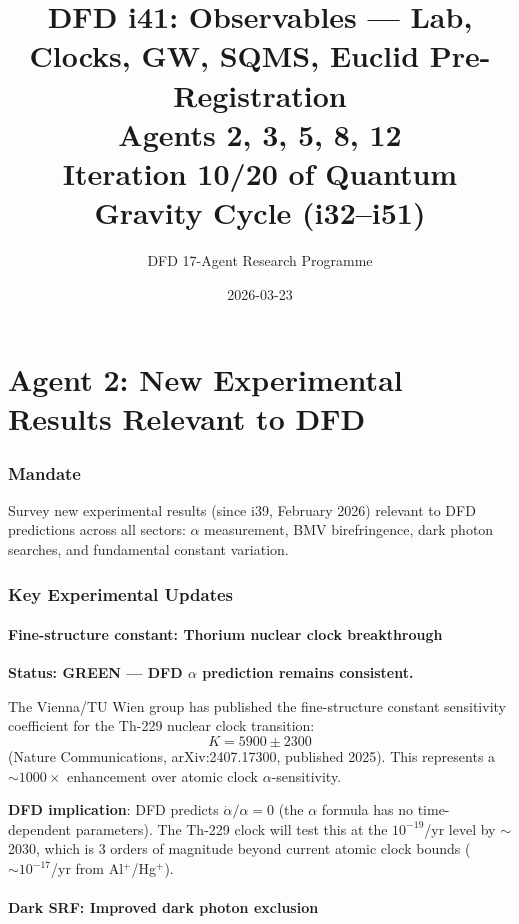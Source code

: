 \documentclass[11pt,a4paper]{article}
\title{DFD i41: Observables --- Lab, Clocks, GW, SQMS, Euclid Pre-Registration\\[6pt]
\large Agents 2, 3, 5, 8, 12\\[6pt]
\normalsize Iteration 10/20 of Quantum Gravity Cycle (i32--i51)}
\author{DFD 17-Agent Research Programme}
\date{2026-03-23}
\newcommand{\GREEN}{\textcolor{dfdgreen}{\textbf{GREEN}}}
\begin{document}
\maketitle
\tableofcontents
\newpage

\part{Agent 2: New Experimental Results Relevant to DFD}
\label{part:agent2}

\section{Mandate}

Survey new experimental results (since i39, February 2026) relevant to DFD predictions across all sectors: $\alpha$ measurement, BMV birefringence, dark photon searches, and fundamental constant variation.

\section{Key Experimental Updates}

\subsection{Fine-structure constant: Thorium nuclear clock breakthrough}

\textbf{Status: \GREEN{} --- DFD $\alpha$ prediction remains consistent.}

The Vienna/TU Wien group has published the fine-structure constant sensitivity coefficient for the Th-229 nuclear clock transition:
\begin{equation}
K = 5900 \pm 2300
\end{equation}
(Nature Communications, arXiv:2407.17300, published 2025). This represents a $\sim 1000\times$ enhancement over atomic clock $\alpha$-sensitivity.

\textbf{DFD implication}: DFD predicts $\dot{\alpha}/\alpha = 0$ (the $\alpha$ formula has no time-dependent parameters). The Th-229 clock will test this at the $10^{-19}$/yr level by $\sim$2030, which is 3 orders of magnitude beyond current atomic clock bounds ($\sim 10^{-17}$/yr from Al$^+$/Hg$^+$).

\subsection{Dark SRF: Improved dark photon exclusion}
\end{document}
